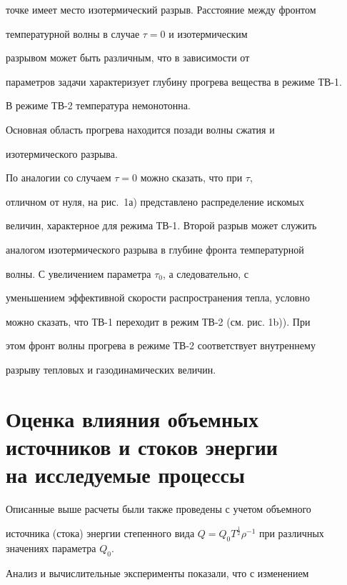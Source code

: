 точке имеет место изотермический разрыв. Расстояние между фронтом


температурной волны в случае $\tau=0$ и изотермическим


разрывом может быть различным, что в зависимости от


параметров задачи характеризует глубину прогрева вещества в режиме ТВ-1.


В режиме ТВ-2 температура немонотонна.


Основная область прогрева находится позади волны сжатия и


изотермического разрыва.





По аналогии со случаем $\tau=0$ можно сказать, что при $\tau$,


отличном от нуля, на рис.~1а) представлено распределение искомых


величин, характерное для режима ТВ-1. Второй разрыв может служить


аналогом изотермического разрыва в глубине фронта температурной


волны. С увеличением параметра $\tau _0$, а следовательно, с


уменьшением эффективной скорости распространения тепла, условно


можно сказать, что ТВ-1 переходит в режим ТВ-2 (см. рис. 1b)). При


этом фронт волны прогрева в режиме ТВ-2 соответствует внутреннему


разрыву тепловых и газодинамических величин.








\section{Оценка влияния объемных источников и стоков энергии\protect\\


на исследуемые процессы}





Описанные выше расчеты были также проведены с учетом объемного


источника (стока) энергии степенного вида $Q = Q_{0} T^{\frac


{1}{2}} {\rho}^{-1}$ при различных значениях параметра $Q_{0}$.


Анализ и вычислительные эксперименты показали, что с изменением


